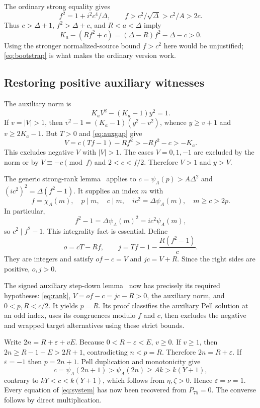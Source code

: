 \documentclass[11pt,a4paper]{article}
\theoremstyle{definition}\newtheorem{definition}[theorem]{Definition}
\begin{document}
The ordinary strong equality gives
\[
 f^2=1+i^2c^4/\Delta,\qquad
 f>c^2/\sqrt\Delta>c^2/A>2c.
\]
Thus $c>\Delta+1$, $f^2>\Delta+c$, and $R<a<\Delta$ imply
\begin{equation}\label{eq:auxgap}
 K_a-(Rf^2+c)=(\Delta-R)f^2-\Delta-c>0.
\end{equation}
Using the stronger normalized-source bound $f>c^2$ here would be
unjustified; \eqref{eq:bootstrap} is what makes the ordinary version work.

\subsection{Restoring positive auxiliary witnesses}
The auxiliary norm is
\[
 K_aV^2-(K_a-1)y^2=1.
\]
If $v=|V|>1$, then
$v^2-1=(K_a-1)(y^2-v^2)$, whence $y\ge v+1$ and
$v\ge2K_a-1$. But $T>0$ and \eqref{eq:auxgap} give
\[
 V=c(Tf-1)-Rf^2>-Rf^2-c>-K_a.
\]
This excludes negative $V$ with $|V|>1$. The cases $V=0,1,-1$
are excluded by the norm or by $V\equiv-c\pmod f$ and
$2<c<f/2$. Therefore $V>1$ and $y>V$.

The generic strong-rank lemma~\cite{rank} applies to
$c=\psi_A(p)>A\Delta^2$ and $(ic^2)^2=\Delta(f^2-1)$.
It supplies an index $m$ with
\begin{equation}\label{eq:rank}
 f=\chi_A(m),\quad p\mid m,\quad c\mid m,\quad
 ic^2=\Delta\psi_A(m),\quad m\ge c>2p.
\end{equation}
In particular,
\[
 f^2-1=\Delta\psi_A(m)^2=ic^2\psi_A(m),
\]
so $c^2\mid f^2-1$. This integrality fact is essential.
Define
\begin{equation}\label{eq:restoredaux}
 o=cT-Rf,\qquad j=Tf-1-\frac{R(f^2-1)}c.
\end{equation}
They are integers and satisfy $of-c=V$ and $jc=V+R$.
Since the right sides are positive, $o,j>0$.

The signed auxiliary step-down lemma~\cite{reverse} now has precisely
its required hypotheses: \eqref{eq:rank},
$V=of-c=jc-R>0$, the auxiliary norm, and $0<p,R<c/2$.
It yields $p=R$. Its proof classifies the auxiliary Pell solution at
an odd index, uses its congruences modulo $f$ and $c$, then excludes
the negative and wrapped target alternatives using these strict bounds.

Write $2n=R+\varepsilon+vE$. Because $0<R+\varepsilon<E$, $v\ge0$.
If $v\ge1$, then $2n\ge R-1+E>2R+1$, contradicting $n<p=R$.
Therefore $2n=R+\varepsilon$. If $\varepsilon=-1$ then $p=2n+1$.
Pell duplication and monotonicity give
\[
 c=\psi_A(2n+1)>\psi_A(2n)\ge A k>k(Y+1),
\]
contrary to $kY<c<k(Y+1)$, which follows from $\eta,\zeta>0$.
Hence $\varepsilon=\nu=1$. Every equation of
\eqref{eq:system} has now been recovered from $P_{75}=0$.
The converse follows by direct multiplication.
\end{document}
